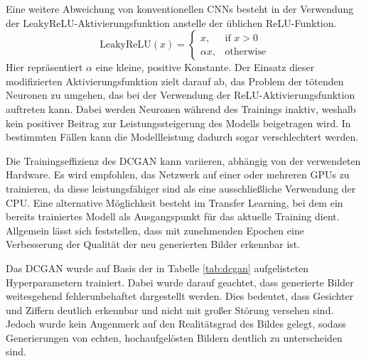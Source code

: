 Eine weitere Abweichung von konventionellen CNNs besteht in der Verwendung der LeakyReLU-Aktivierungsfunktion anstelle der üblichen ReLU-Funktion.
\begin{equation}
	\text{LeakyReLU}(x) = \begin{cases}
		x, & \text{if } x > 0 \\
		\alpha x, & \text{otherwise}
	\end{cases}
\end{equation}
Hier repräsentiert $\alpha$ eine kleine, positive Konstante. Der Einsatz dieser modifizierten Aktivierungsfunktion zielt darauf ab, das Problem der \glqq tötenden Neuronen\grqq{} zu umgehen, das bei der Verwendung der ReLU-Aktivierungsfunktion auftreten kann. Dabei werden Neuronen während des Trainings inaktiv, weshalb kein positiver Beitrag zur Leistungssteigerung des Modells beigetragen wird. In bestimmten Fällen kann die Modellleistung dadurch sogar verschlechtert werden. 

Die Trainingseffizienz des DCGAN kann variieren, abhängig von der verwendeten Hardware. Es wird empfohlen, das Netzwerk auf einer oder mehreren GPUs zu trainieren, da diese leistungsfähiger sind als eine ausschließliche Verwendung der CPU. Eine alternative Möglichkeit besteht im Transfer Learning, bei dem ein bereits trainiertes Modell als Ausgangspunkt für das aktuelle Training dient. Allgemein lässt sich feststellen, dass mit zunehmenden Epochen eine Verbesserung der Qualität der neu generierten Bilder erkennbar ist.

\begin{table}[h]
	\centering
	\renewcommand{\arraystretch}{1.5}
	\caption{Hyperparameter eines DCGAN-Trainings bezüglich der angegebenen Datensätze}
	\label{tab:dcgan}
\end{table}

Das DCGAN wurde auf Basis der in Tabelle \ref{tab:dcgan} aufgelisteten Hyperparametern trainiert. Dabei wurde darauf geachtet, dass generierte Bilder \glqq weitesgehend fehlerunbehaftet\grqq{} dargestellt werden. Dies bedeutet, dass Gesichter und Ziffern deutlich erkennbar und nicht mit großer Störung versehen sind. Jedoch wurde kein Augenmerk auf den Realitätsgrad des Bildes gelegt, sodass Generierungen von echten, hochaufgelösten Bildern deutlich zu unterscheiden sind. 

